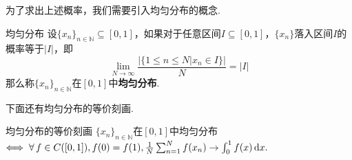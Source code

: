 为了求出上述概率，我们需要引入均匀分布的概念.\par

\begin{definition}{均匀分布}
    设$\{x_n\}_{n\in\mathbb{N}} \subseteq [0,1]$，如果对于任意区间$I \subseteq [0,1]$，$\{x_n\}$落入区间$I$的概率等于$|I|$，即
    \[\lim_{N\to\infty}{\frac{\Big|\big\{1\leqslant n \leqslant N|x_n \in I\big\}\Big|}{N}} = |I|\]
    那么称$\{x_n\}_{n\in\mathbb{N}}$在$[0,1]$中\textbf{均匀分布}.
\end{definition}

下面还有均匀分布的等价刻画.
\begin{proposition}{均匀分布的等价刻画}
    $\{x_n\}_{n\in\mathbb{N}}$在$[0,1]$中均匀分布$\Longleftrightarrow\; \forall\, f\in C([0,1]), f(0)=f(1), \frac{1}{N}\sum_{n=1}^N{f(x_n)}\to \int_{0}^{1}{f(x)}\mathop{}\!\mathrm{d} x.$
\end{proposition}
